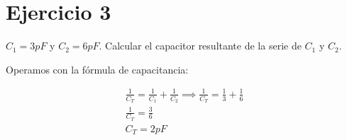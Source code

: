\section{Ejercicio 3}

\(C_1 = 3 pF\) y \(C_2 = 6 pF\). Calcular el capacitor resultante de la serie de \(C_1\) y \(C_2\).

Operamos con la fórmula de capacitancia:

\begin{align*}
    \frac{1}{C_T} = \frac{1}{C_1} + \frac{1}{C_2} \implies \frac{1}{C_T} = \frac{1}{3} + \frac{1}{6} \\
    \frac{1}{C_T} = \frac{3}{6} \\
    \boxed{C_T = 2pF} \\
\end{align*}